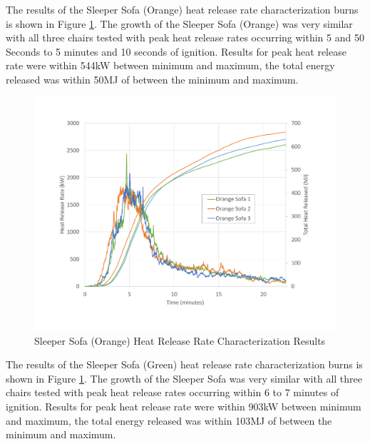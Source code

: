 \documentclass{article}
\begin{document}
The results of the Sleeper Sofa (Orange) heat release rate characterization burns is shown in Figure \ref{fig:SofaOrangeHRR}. The growth of the Sleeper Sofa (Orange) was very similar with all three chairs tested with peak heat release rates occurring within 5 and 50 Seconds to 5 minutes and 10 seconds of ignition. Results for peak heat release rate were within 544kW between minimum and maximum, the total energy released was within 50MJ of between the minimum and maximum. 

\begin{figure}[H]
	\centering
	\includegraphics[height=0.45\textheight]{0_Images/Furniture/Sofa_Orange_HRR.pdf}
	\caption{Sleeper Sofa (Orange) Heat Release Rate Characterization Results}
	\label{fig:SofaOrangeHRR}
\end{figure}

The results of the Sleeper Sofa (Green) heat release rate characterization burns is shown in Figure \ref{fig:SofaOrangeHRR}. The growth of the Sleeper Sofa was very similar with all three chairs tested with peak heat release rates occurring within 6 to 7 minutes of ignition. Results for peak heat release rate were within 903kW between minimum and maximum, the total energy released was within 103MJ of between the minimum and maximum. 
\end{document}
